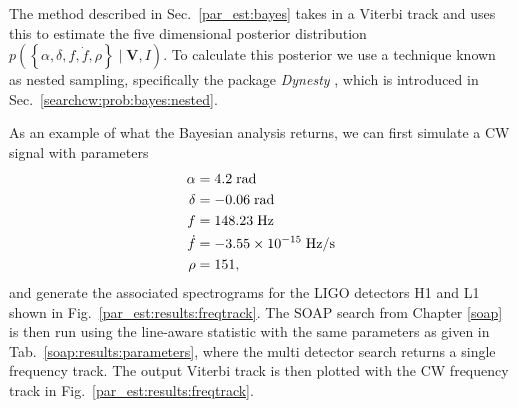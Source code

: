 The method described in Sec.~\ref{par_est:bayes} takes in a Viterbi track and
uses this to estimate the five dimensional posterior distribution
$p\left(\left\{ \alpha, \delta, f, \dot{f}, \rho \right\} \mid \bm{V}, I
\right)$.  To calculate this posterior we use a technique known as nested
sampling, specifically the package {\it Dynesty}
\citep{speagle2019DynestyDynamic}, which is introduced in
Sec.~\ref{searchcw:prob:bayes:nested}.

As an example of what the Bayesian analysis returns, we can first simulate a \gls{CW} signal with
parameters 
%
\begin{equation}
    \label{par_est:results:examplepars}
    \begin{split}
        \alpha &= 4.2 \; \rm{rad}\\
        \delta &= -0.06 \; \rm{rad} \\
        f &= 148.23 \; \rm{Hz}\\
        \dot{f} &= -3.55 \times 10^{-15} \; \rm{Hz/s} \\
        \rho &= 151,\\
    \end{split}
\end{equation}
%
and generate the associated spectrograms for the \gls{LIGO} detectors H1 and
L1 shown in Fig.~\ref{par_est:results:freqtrack}. The SOAP search from
Chapter \ref{soap} is then run using the line-aware statistic with the same
parameters as given in Tab.~\ref{soap:results:parameters}, where the multi detector search returns a single frequency track. The output Viterbi track is then plotted with the \gls{CW} frequency track in Fig.~\ref{par_est:results:freqtrack}. 
%
